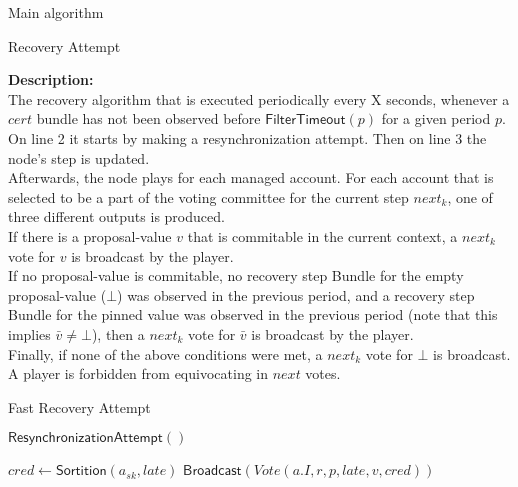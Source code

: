 \documentclass[10pt,a4paper]{article}
\begin{document}
\begin{section}{Main algorithm}
\begin{subsection}{Recovery Attempt}
\begin{algorithm}[H]
\begin{algorithmic}[1]
        \EndFunction
        \end{algorithmic}
        \caption{\underline{Recovery}}
    \end{algorithm}
    
    
    \noindent \textbf{Description:}\\
The recovery algorithm that is executed periodically every X seconds, 
whenever a $cert$ bundle has not been observed before $\mathsf{FilterTimeout}(p)$ for a given period $p$. \\
On line 2 it starts by making a resynchronization attempt. Then on line 3 the node's step is updated.\\
Afterwards, the node plays for each managed account. For each account that is selected to be a part of the voting committee for the current
step $next_k$, one of three different outputs is produced. \\
If there is a proposal-value $v$ that is commitable in the current context, a $next_k$ vote for $v$ is broadcast by the player. \\
If no proposal-value is commitable, no recovery step Bundle for the empty proposal-value ($\bot$) was observed in the 
previous period, and a recovery step Bundle for the pinned value was observed in the previous period (note that this implies $\bar{v} \neq \bot$),
then a $next_k$ vote for $\bar{v}$ is broadcast by the player. \\
Finally, if none of the above conditions were met, a $next_k$ vote for $\bot$ is broadcast. A player is forbidden
from equivocating in $next$ votes.

\end{subsection}


\begin{subsection}{Fast Recovery Attempt}\label{ssect:FastRecovery}

    \begin{algorithm}[H]
        \begin{algorithmic}[1]


        \State $\mathsf{ResynchronizationAttempt}()$
    
                \State $cred \gets 
                \mathsf{Sortition}(a_{sk}, late)$
                    \State $\mathsf{Broadcast}(Vote(a.I, r, p, late, v, cred))$
                \EndIf


\end{algorithmic}
\end{algorithm}
\end{subsection}
\end{section}
\end{document}
